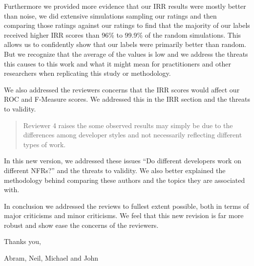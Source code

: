 \documentclass{article}
\begin{document}
Furthermore we provided more evidence that our IRR results were mostly
better than noise, we did extensive simulations sampling our ratings
and then comparing those ratings against our ratings to find that the
majority of our labels received higher IRR scores than 96\% to 99.9\%
of the random simulations. This allows us to confidently show that our
labels were primarily better than random. But we recognize that the
average of the values is low and we address the threats this causes to
this work and what it might mean for practitioners and other
researchers when replicating this study or methodology.

We also addressed the reviewers concerns that the IRR scores would
affect our ROC and F-Measure scores. We addressed this in the IRR
section and the threats to validity.

\begin{quotation}
 Reviewer 4 raises the some observed results may simply be due to
 the differences among developer styles and not necessarily
 reflecting different types of work.  
\end{quotation}

In this new version, we addressed these issues ``Do different
developers work on different NFRs?''  and the threats to validity. We
also better explained the methodology behind comparing these authors
and the topics they are associated with.

In conclusion we addressed the reviews to fullest extent possible,
both in terms of major criticisms and minor criticisms. We feel that
this new revision is far more robust and show ease the concerns of the
reviewers.

Thanks you,

Abram, Neil, Michael and John
\end{document}

